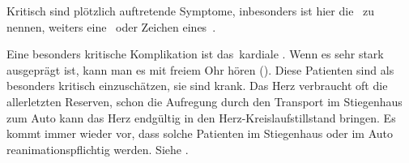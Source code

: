 {\begin{ABCDEText}
  Kritisch sind plötzlich auftretende Symptome, inbesonders ist hier die
  {\RedFlag}\, zu nennen, weiters eine
  {\RedFlag}\, oder Zeichen
  eines {\RedFlag}\,.
  
  Eine besonders kritische
  Komplikation ist das {\RedFlag}\,kardiale .
  Wenn es sehr stark ausgeprägt ist, kann man es mit freiem
  Ohr hören (). Diese
  Patienten sind als besonders kritisch einzuschätzen, sie
  sind  krank. Das Herz verbraucht oft die
  allerletzten Reserven, schon die Aufregung durch den
  Transport im Stiegenhaus zum Auto kann das Herz endgültig in
  den Herz-Kreislaufstillstand bringen. Es kommt immer wieder
  vor, dass solche Patienten im Stiegenhaus oder im Auto
  reanimationspflichtig werden. Siehe 
  .
\end{ABCDEText}
}
